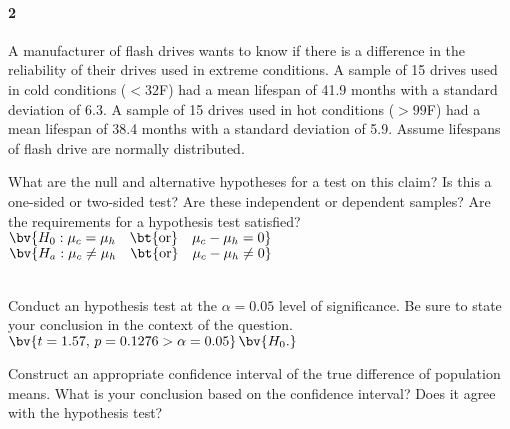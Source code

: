 \documentclass{article}
\begin{document}
\begin{flushleft}
\newpage
\paragraph{2} A manufacturer of flash drives wants to know if there is a difference in the reliability of their drives used in extreme conditions. A sample of 15 drives used in cold conditions ($< 32 $\textdegree F) had a mean lifespan of 41.9 months with a standard deviation of 6.3. A sample of 15 drives used in hot conditions ($> 99 $\textdegree F) had a mean lifespan of 38.4 months with a standard deviation of 5.9. Assume lifespans of flash drive are normally distributed.
\begin{enumalpha}
\item What are the null and alternative hypotheses for a test on this claim? Is this a one-sided or two-sided test? Are these independent or dependent samples? Are the requirements for a hypothesis test satisfied?\\
\medskip
$\bv{H_0: \mu_c = \mu_h \quad \text{\bt{or}} \quad \mu_c - \mu_h = 0}$ \\
$\bv{H_a: \mu_c \ne \mu_h \quad \text{\bt{or}} \quad \mu_c - \mu_h \ne 0}$ \\
\\
\vspace{.5in}
\item Conduct an hypothesis test at the $\alpha = 0.05$ level of significance. Be sure to state your conclusion in the context of the question.\\
\medskip
$\bv{t = 1.57, \, p = 0.1276 > \alpha =0.05}$$\bv{H_0.}$\\
\vspace{.5in}
\item Construct an appropriate confidence interval of the true difference of population means. What is your conclusion based on the confidence interval? Does it agree with the hypothesis test?\\
\medskip
{}\\
\end{enumalpha}


\end{flushleft}
\end{document}
